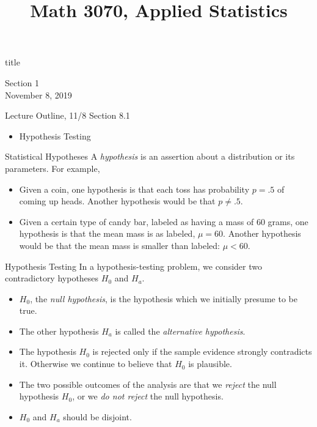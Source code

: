 \documentclass[t,handout]{beamer}
\title{Math 3070, Applied Statistics}
\newcommand{\nl}[1]{\vspace{#1 em}}
\begin{document}
\begin{frame}[c]
    \begin{beamercolorbox}[rounded=true,wd=\textwidth,center]{title}
        \inserttitle
    \end{beamercolorbox}
    \begin{center}
        Section 1\\
        \nl{0.5}
        November 8, 2019
    \end{center}
\end{frame}
\begin{frame}[c]{Lecture Outline, 11/8}
    Section 8.1
    \begin{itemize}
        \item Hypothesis Testing
    \end{itemize}
\end{frame}

\begin{frame}{Statistical Hypotheses}
    A \emph{hypothesis} is an assertion about a distribution or its parameters. \pause For example,
    \begin{itemize}
    \item Given a coin, one hypothesis is that each toss has probability $p=.5$ of coming up heads. \pause Another hypothesis would be that $p\neq .5$.
    \pause \item Given a certain type of candy bar, labeled as having a mass of 60 grams, one hypothesis is that the mean mass is as labeled, $\mu=60$. \pause Another hypothesis would be that the mean mass is smaller than labeled: $\mu<60$.
    \end{itemize}
    \end{frame}
    
    \begin{frame}{Hypothesis Testing}
    In a hypothesis-testing problem, we consider two contradictory hypotheses $H_0$ and $H_a$.
    \begin{itemize}
    \pause \item $H_0$, the \emph{null hypothesis}, is the hypothesis which we initially presume to be true.
    \pause \item The other hypothesis $H_a$ is called the \emph{alternative hypothesis}.
    \pause \item The hypothesis $H_0$ is rejected only if the sample evidence strongly contradicts it. Otherwise we continue to believe that $H_0$ is plausible.
    \pause \item The two possible outcomes of the analysis are that we \emph{reject} the null hypothesis $H_0$, or we \emph{do not reject} the null hypothesis.
    \item $H_0$ and $H_a$ should be disjoint.
    \end{itemize}
    
    \end{frame}
\end{document}
